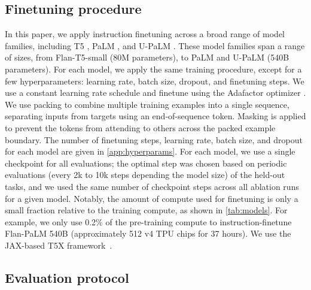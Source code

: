 \subsection{Finetuning procedure} In this paper, we apply instruction finetuning across a broad range of model families, including T5 \citep{raffel2020exploring}, PaLM \citep{chowdhery2022palm}, and U-PaLM \citep{tay2022transcending}. These model families span a range of sizes, from Flan-T5-small (80M parameters), to PaLM and U-PaLM (540B parameters). For each model, we apply the same training procedure, except for a few hyperparameters: learning rate, batch size, dropout, and finetuning steps. We use a constant learning rate schedule and finetune using the Adafactor optimizer \citep{shazeer2018adafactor}. We use packing \citep{raffel2020exploring} to combine multiple training examples into a single sequence, separating inputs from targets using an end-of-sequence token. Masking is applied to prevent the tokens from attending to others across the packed example boundary. The number of finetuning steps, learning rate, batch size, and dropout for each model are given in \ref{app:hyperparams}.
For each model, we use a single checkpoint for all evaluations; the optimal step was chosen based on periodic evaluations (every 2k to 10k steps depending the model size) of the held-out tasks, and we used the same number of checkpoint steps across all ablation runs for a given model. Notably, the amount of compute used for finetuning is only a small fraction relative to the training compute, as shown in \ref{tab:models}.
For example, we only use 0.2\% of the pre-training compute to instruction-finetune Flan-PaLM 540B (approximately 512 v4 TPU chips for 37 hours). We use the JAX-based T5X framework~\citep{jax2018github,roberts2022t5x}.

\subsection{Evaluation protocol}\label{sec:evaluation_protocol}

